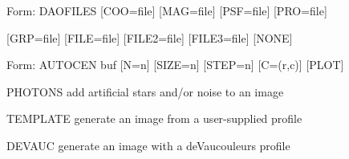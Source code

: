 {\newpage\clearpage
{}%
\begin{command}
  \item[Form: DAOFILES {[COO=file]} {[MAG=file]} {[PSF=file]} {[PRO=file]}\hfill]{}
  \item{{[GRP=file]} {[FILE=file]} {[FILE2=file]} {[FILE3=file]} {[NONE]}}
\end{command}%
\lthtmlfigureZ
\lthtmlcheckvsize\clearpage}

{\newpage\clearpage
{}%
\begin{command}
  \item[Form: AUTOCEN buf {[N=n]} {[SIZE=n]} {[STEP=n]} {[C=(r,c)]} 
       {[PLOT]}\hfill]{}
\end{command}%
\lthtmlfigureZ
\lthtmlcheckvsize\clearpage}

{\newpage\clearpage
{}%
\begin{example}
  \item[PHOTONS\hfill]{add artificial stars and/or noise to an image}
  \item[TEMPLATE\hfill]{generate an image from a user-supplied profile}
  \item[DEVAUC\hfill]{generate an image with a deVaucouleurs profile}
\end{example}%
\lthtmlfigureZ
\lthtmlcheckvsize\clearpage}

